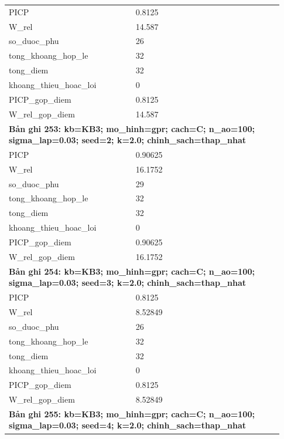 \begin{longtable}{p{0.43\linewidth}p{0.50\linewidth}}
PICP & 0.8125 \\
W\_\allowbreak rel & 14.587 \\
so\_\allowbreak duoc\_\allowbreak phu & 26 \\
tong\_\allowbreak khoang\_\allowbreak hop\_\allowbreak le & 32 \\
tong\_\allowbreak diem & 32 \\
khoang\_\allowbreak thieu\_\allowbreak hoac\_\allowbreak loi & 0 \\
PICP\_\allowbreak gop\_\allowbreak diem & 0.8125 \\
W\_\allowbreak rel\_\allowbreak gop\_\allowbreak diem & 14.587 \\
\midrule
\multicolumn{2}{p{0.95\linewidth}}{\textbf{Bản ghi 253: kb=KB3; mo\_hinh=gpr; cach=C; n\_ao=100; sigma\_lap=0.03; seed=2; k=2.0; chinh\_sach=thap\_nhat}} \\
PICP & 0.90625 \\
W\_\allowbreak rel & 16.1752 \\
so\_\allowbreak duoc\_\allowbreak phu & 29 \\
tong\_\allowbreak khoang\_\allowbreak hop\_\allowbreak le & 32 \\
tong\_\allowbreak diem & 32 \\
khoang\_\allowbreak thieu\_\allowbreak hoac\_\allowbreak loi & 0 \\
PICP\_\allowbreak gop\_\allowbreak diem & 0.90625 \\
W\_\allowbreak rel\_\allowbreak gop\_\allowbreak diem & 16.1752 \\
\midrule
\multicolumn{2}{p{0.95\linewidth}}{\textbf{Bản ghi 254: kb=KB3; mo\_hinh=gpr; cach=C; n\_ao=100; sigma\_lap=0.03; seed=3; k=2.0; chinh\_sach=thap\_nhat}} \\
PICP & 0.8125 \\
W\_\allowbreak rel & 8.52849 \\
so\_\allowbreak duoc\_\allowbreak phu & 26 \\
tong\_\allowbreak khoang\_\allowbreak hop\_\allowbreak le & 32 \\
tong\_\allowbreak diem & 32 \\
khoang\_\allowbreak thieu\_\allowbreak hoac\_\allowbreak loi & 0 \\
PICP\_\allowbreak gop\_\allowbreak diem & 0.8125 \\
W\_\allowbreak rel\_\allowbreak gop\_\allowbreak diem & 8.52849 \\
\midrule
\multicolumn{2}{p{0.95\linewidth}}{\textbf{Bản ghi 255: kb=KB3; mo\_hinh=gpr; cach=C; n\_ao=100; sigma\_lap=0.03; seed=4; k=2.0; chinh\_sach=thap\_nhat}} \\

\end{longtable}
